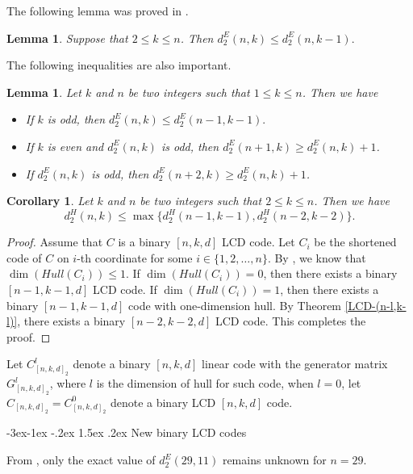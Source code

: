 \documentclass[12pt,twoside]{article}
\makeatletter
\renewcommand\subsection{\@startsection{subsection}{2}{\z@}%
                                     {-3ex\@plus -1ex \@minus -.2ex}%
                                     {1.5ex \@plus .2ex}%
                                     {\normalfont\normalsize\bfseries}}
\theoremstyle{plain}
\newtheorem{lem}[theorem]{Lemma}
\newtheorem{cor}[theorem]{Corollary}
\theoremstyle{definition}
\theoremstyle{remark}
\makeatother
\begin{document}
The following lemma was proved in \cite[Theorem 8]{LCD-new}.
\begin{lem}{\rm\cite{LCD-new}}\label{lemma-leq}
Suppose that $2\leq k\leq n$. Then
$d^E_2(n,k)\leq d^E_2(n,k-1).$
\end{lem}


The following inequalities are also important.
\begin{lem}{\rm\cite{B-LCD-40}}\label{lemma-leq-2}
Let $k$ and $n$ be two integers such that $1\leq k\leq n$. Then we have
\begin{itemize}
  \item [(1)] If $k$ is odd, then $d^E_2(n,k)\leq d^E_2(n-1,k-1).$
  \item [(2)] If $k$ is even and $d^E_2(n,k)$ is odd, then $d^E_2(n+1,k)\geq d^E_2(n,k)+1$.
  \item [(3)] If $d^E_2(n,k)$ is odd, then $d^E_2(n+2,k)\geq d^E_2(n,k)+1$.
\end{itemize}
\end{lem}



\begin{cor}\label{cor-4.4}
Let $k$ and $n$ be two integers such that $2\leq k\leq n$. Then we have
$$d^H_2(n,k)\leq \max\{d^H_2(n-1,k-1),d^H_2(n-2,k-2)\}.$$
\end{cor}
\begin{proof}
Assume that $C$ is a binary $[n,k,d]$ LCD code. Let $C_i$ be the
shortened code of $C$ on $i$-th coordinate for some $i\in \{1,2,\ldots,n\}$. By \cite[Proposition 5]{B-LCD-40}, we know that $\dim(Hull(C_i))\leq 1$.
If $\dim(Hull(C_i))=0$, then there exists a binary $[n-1,k-1,d]$ LCD code.
If $\dim(Hull(C_i))=1$, then there exists a binary $[n-1,k-1,d]$ code with one-dimension hull. By Theorem \ref{LCD-(n-l,k-l)}, there exists a binary $[n-2,k-2,d]$ LCD code.
 This completes the proof.
\end{proof}


Let $C^{l}_{[n,k,d]_2}$ denote a binary $[n,k,d]$ linear code with the generator matrix $G^{l}_{[n,k,d]_2}$, where $l$ is the dimension of hull for such code, when $l=0$, let $C_{[n,k,d]_2}=C^{0}_{[n,k,d]_2}$ denote a binary LCD $[n,k,d]$ code.

\subsection{New binary LCD codes}


From \cite{B-LCD-40}, only the exact value of $d_{2}^E(29,11)$ remains unknown for $n=29$.
\end{document}
